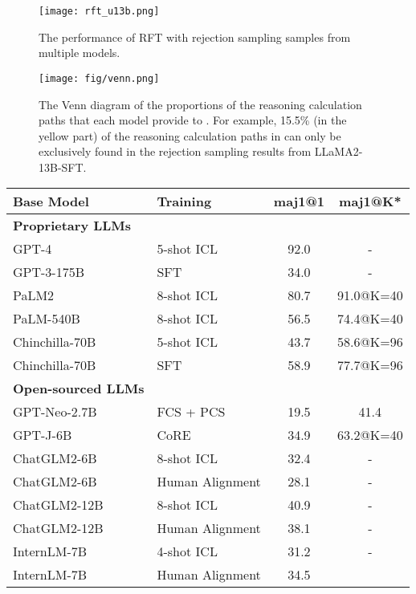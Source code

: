 \documentclass{article} \usepackage{iclr2021_conference,times}
\begin{document}
 \begin{figure}[t]
    \centering
\texttt{[image: rft\_u13b.png]}
    \caption{The performance of RFT with rejection sampling samples from multiple models.}
    \label{fig:rft_u13b}
\end{figure}

\begin{figure}[t]
    \centering
    \texttt{[image: fig/venn.png]}
    \caption{The Venn diagram of the proportions of the reasoning calculation paths that each model provide to . For example, 15.5\% (in the yellow part) of the reasoning calculation paths in  can only be exclusively found in the rejection sampling results from LLaMA2-13B-SFT.}
    \label{fig:venn}
\end{figure}

\begin{table}[t]
    \small
    \centering
    \begin{tabular}{ll|cc}
  \hline
  Base Model & Training & maj1@1 & maj1@K* \\
  \hline
  \bf{Proprietary LLMs} &&& \\
  GPT-4 \citep{gpt4} & 5-shot ICL & 92.0 & - \\
GPT-3-175B \citep{gpt3} & SFT & 34.0 & - \\
  PaLM2 \citep{anil2023palm} & 8-shot ICL & 80.7 & 91.0@K=40 \\
  PaLM-540B \citep{chowdhery2022palm} & 8-shot ICL & 56.5 & 74.4@K=40 \\
  Chinchilla-70B \citep{uesato2022solving} & 5-shot ICL & 43.7 & 58.6@K=96  \\
  Chinchilla-70B & SFT & 58.9 & 77.7@K=96  \\
  \hline
  \bf{Open-sourced LLMs} &&& \\
GPT-Neo-2.7B \citep{gpt-neo} & FCS + PCS \citep{ni2023learning} & 19.5 & 41.4 \\
  GPT-J-6B \citep{gpt-j} & CoRE \citep{zhu-etal-2023-solving} & 34.9 & 63.2@K=40 \\
  ChatGLM2-6B \citep{zeng2022glm} & 8-shot ICL & 32.4	& - \\
  ChatGLM2-6B & Human Alignment & 28.1	& - \\
  ChatGLM2-12B & 8-shot ICL & 40.9	& - \\
  ChatGLM2-12B & Human Alignment & 38.1	& - \\
  InternLM-7B \citep{2023internlm} & 4-shot ICL & 31.2	& - \\
  InternLM-7B & Human Alignment & 34.5 \\

\end{tabular}
\end{table}
\end{document}
